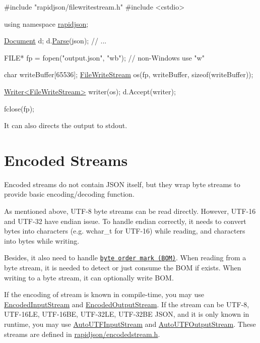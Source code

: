 \begin{DoxyCode}
\textcolor{preprocessor}{#include "rapidjson/filewritestream.h"}
\textcolor{preprocessor}{#include <cstdio>}

\textcolor{keyword}{using namespace }\hyperlink{namespacerapidjson}{rapidjson};

\hyperlink{class_generic_document}{Document} d;
d.\hyperlink{class_generic_document_aebd4e7fddd80c1e1174837aee6d2159b}{Parse}(json);
\textcolor{comment}{// ...}

FILE* fp = fopen(\textcolor{stringliteral}{"output.json"}, \textcolor{stringliteral}{"wb"}); \textcolor{comment}{// non-Windows use "w"}

\textcolor{keywordtype}{char} writeBuffer[65536];
\hyperlink{class_file_write_stream}{FileWriteStream} os(fp, writeBuffer, \textcolor{keyword}{sizeof}(writeBuffer));

\hyperlink{class_writer}{Writer<FileWriteStream>} writer(os);
d.Accept(writer);

fclose(fp);
\end{DoxyCode}


It can also directs the output to {\ttfamily stdout}.\hypertarget{md_Commun_Externe_RapidJSON_doc_stream.zh-cn_EncodedStreams}{}\section{Encoded Streams}\label{md_Commun_Externe_RapidJSON_doc_stream.zh-cn_EncodedStreams}
Encoded streams do not contain J\+S\+ON itself, but they wrap byte streams to provide basic encoding/decoding function.

As mentioned above, U\+T\+F-\/8 byte streams can be read directly. However, U\+T\+F-\/16 and U\+T\+F-\/32 have endian issue. To handle endian correctly, it needs to convert bytes into characters (e.\+g. {\ttfamily wchar\+\_\+t} for U\+T\+F-\/16) while reading, and characters into bytes while writing.

Besides, it also need to handle \href{http://en.wikipedia.org/wiki/Byte_order_mark}{\tt byte order mark (B\+OM)}. When reading from a byte stream, it is needed to detect or just consume the B\+OM if exists. When writing to a byte stream, it can optionally write B\+OM.

If the encoding of stream is known in compile-\/time, you may use {\ttfamily \hyperlink{class_encoded_input_stream}{Encoded\+Input\+Stream}} and {\ttfamily \hyperlink{class_encoded_output_stream}{Encoded\+Output\+Stream}}. If the stream can be U\+T\+F-\/8, U\+T\+F-\/16\+LE, U\+T\+F-\/16\+BE, U\+T\+F-\/32\+LE, U\+T\+F-\/32\+BE J\+S\+ON, and it is only known in runtime, you may use {\ttfamily \hyperlink{class_auto_u_t_f_input_stream}{Auto\+U\+T\+F\+Input\+Stream}} and {\ttfamily \hyperlink{class_auto_u_t_f_output_stream}{Auto\+U\+T\+F\+Output\+Stream}}. These streams are defined in {\ttfamily \hyperlink{encodedstream_8h_source}{rapidjson/encodedstream.\+h}}.

